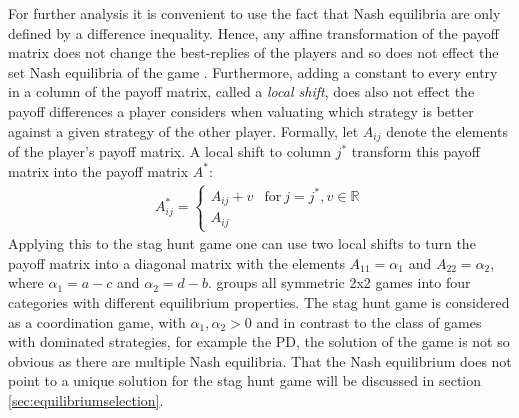\documentclass[11pt]{article}
\newcommand{\realnumb}{\mathbb{R}}
\begin{document}
For further analysis it is convenient to use the fact that Nash equilibria 
are only defined by a difference inequality. 
Hence, any affine transformation of the payoff matrix does not change the 
best-replies of the players and so does not effect the set Nash equilibria 
of the game \parencite[17-19]{weibull_evolutionary_1997}. 
Furthermore, adding a constant to every entry in a column of the payoff matrix, 
called a \textit{local shift}, does also not effect the payoff differences
a player considers when valuating which strategy is better against a given
strategy of the other player.
Formally, let $A_{ij}$ denote the elements of the player's payoff matrix. 
A local shift to column $j^*$ transform this payoff matrix into the payoff 
matrix $A^*$:
\begin{align*}
        A^*_{ij} =
        \begin{cases}
                A_{ij} + v & \text{for}\ j=j^*, v \in \realnumb \\
                A_{ij}
        \end{cases}
\end{align*}
Applying this to the stag hunt game one can use two local shifts to turn 
the payoff matrix into a diagonal matrix with the elements $A_{11}=\alpha_1$ 
and $A_{22}=\alpha_2$, where $\alpha_1=a-c$ and $\alpha_2=d-b$. 
\textcite[28]{weibull_evolutionary_1997} groups all symmetric 2x2 games into 
four categories with different equilibrium properties. 
The stag hunt game is considered as a coordination 
game, with $\alpha_1, \alpha_2 > 0$ and in contrast to the class of games
with dominated strategies, for example the PD, the solution of the game
is not so obvious as there are multiple Nash equilibria.
That the Nash equilibrium does not point to a unique solution for the stag
hunt game will be discussed in section \ref{sec:equilibriumselection}.
\end{document}
